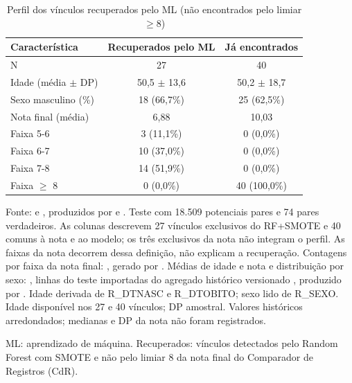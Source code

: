 \begin{table}[htbp]
\centering
\caption{Perfil dos vínculos recuperados pelo ML (não encontrados pelo limiar $\geq 8$)}
\label{tab:perfil-recuperados}
\begin{tabular}{lcc}
\toprule
Característica & Recuperados pelo ML & Já encontrados \\
\midrule
N & 27 & 40 \\
Idade (média $\pm$ DP) & 50,5 $\pm$ 13,6 & 50,2 $\pm$ 18,7 \\
Sexo masculino (\%) & 18 (66,7\%) & 25 (62,5\%) \\
Nota final (média) & 6,88 & 10,03 \\
\quad Faixa 5-6 & 3 (11,1\%) & 0 (0,0\%) \\
\quad Faixa 6-7 & 10 (37,0\%) & 0 (0,0\%) \\
\quad Faixa 7-8 & 14 (51,9\%) & 0 (0,0\%) \\
\quad Faixa $\geq$ 8 & 0 (0,0\%) & 40 (100,0\%) \\
\bottomrule
\end{tabular}
\par\footnotesize Fonte:  e , produzidos por  e . Teste com 18.509 potenciais pares e 74 pares verdadeiros. As colunas descrevem 27 vínculos exclusivos do RF+SMOTE e 40 comuns à nota e ao modelo; os três exclusivos da nota não integram o perfil. As faixas da nota decorrem dessa definição, não explicam a recuperação. Contagens por faixa da nota final: , gerado por . Médias de idade e nota e distribuição por sexo: , linhas do teste importadas do agregado histórico versionado , produzido por . Idade derivada de R\_DTNASC e R\_DTOBITO; sexo lido de R\_SEXO. Idade disponível nos 27 e 40 vínculos; DP amostral. Valores históricos arredondados; medianas e DP da nota não foram registrados.
\par\footnotesize ML: aprendizado de máquina. Recuperados: vínculos detectados pelo Random Forest com SMOTE e não pelo limiar 8 da nota final do Comparador de Registros (CdR).
\end{table}
